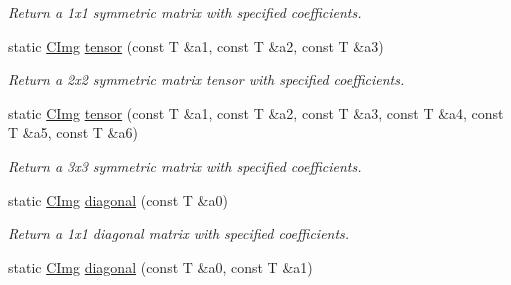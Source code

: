 \begin{DoxyCompactItemize}
\begin{DoxyCompactList}\small\item\em Return a 1x1 symmetric matrix with specified coefficients. \end{DoxyCompactList}\item 
\hypertarget{structcimg__library_1_1_c_img_ae9f5322a5c23eba78071a3a1ebccbd2c}{static \hyperlink{structcimg__library_1_1_c_img}{C\-Img} \hyperlink{structcimg__library_1_1_c_img_ae9f5322a5c23eba78071a3a1ebccbd2c}{tensor} (const T \&a1, const T \&a2, const T \&a3)}\label{structcimg__library_1_1_c_img_ae9f5322a5c23eba78071a3a1ebccbd2c}

\begin{DoxyCompactList}\small\item\em Return a 2x2 symmetric matrix tensor with specified coefficients. \end{DoxyCompactList}\item 
\hypertarget{structcimg__library_1_1_c_img_a9fdc9e8f92ac99e31d16b3a7a9de493f}{static \hyperlink{structcimg__library_1_1_c_img}{C\-Img} \hyperlink{structcimg__library_1_1_c_img_a9fdc9e8f92ac99e31d16b3a7a9de493f}{tensor} (const T \&a1, const T \&a2, const T \&a3, const T \&a4, const T \&a5, const T \&a6)}\label{structcimg__library_1_1_c_img_a9fdc9e8f92ac99e31d16b3a7a9de493f}

\begin{DoxyCompactList}\small\item\em Return a 3x3 symmetric matrix with specified coefficients. \end{DoxyCompactList}\item 
\hypertarget{structcimg__library_1_1_c_img_a4c8441a272c686bc5a4ab3200da524f2}{static \hyperlink{structcimg__library_1_1_c_img}{C\-Img} \hyperlink{structcimg__library_1_1_c_img_a4c8441a272c686bc5a4ab3200da524f2}{diagonal} (const T \&a0)}\label{structcimg__library_1_1_c_img_a4c8441a272c686bc5a4ab3200da524f2}

\begin{DoxyCompactList}\small\item\em Return a 1x1 diagonal matrix with specified coefficients. \end{DoxyCompactList}\item 
\hypertarget{structcimg__library_1_1_c_img_aa5a009dc79e2202d64a9afce4104df32}{static \hyperlink{structcimg__library_1_1_c_img}{C\-Img} \hyperlink{structcimg__library_1_1_c_img_aa5a009dc79e2202d64a9afce4104df32}{diagonal} (const T \&a0, const T \&a1)}\label{structcimg__library_1_1_c_img_aa5a009dc79e2202d64a9afce4104df32}


\end{DoxyCompactItemize}
